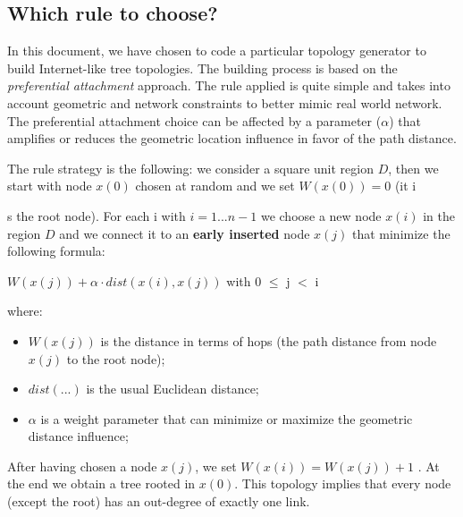 \documentclass[a4paper,11pt]{article}
\begin{document}
\subsection{Which rule to choose?}
\label{sec:rule}

In this document, we have chosen to code a particular topology generator
to build Internet-like tree topologies. The building process is based
on the \emph{preferential attachment} approach. The rule applied is
quite simple and takes into account geometric and network constraints
to better mimic real world network. The preferential attachment choice
can be affected by a parameter ($ \alpha $) that amplifies or reduces the
geometric location influence in favor of the path distance. 

The rule strategy is the following: we consider a square unit region
$D$, then we start with node $x(0)$ chosen at random and we set $W(x(0))
= 0$ (it i

s the root node). For each i with $i = 1...n-1$ we choose a
new node $x(i)$ in the region $D$ and we connect it to an \textbf{early
inserted} node $x(j)$ that minimize the following formula:

\begin{center}
$W(x(j)) + \alpha \cdot dist(x(i), x(j))$ with 0 $\leq$ j $<$ i
\end{center}

where: 

\begin{itemize}
\item $W(x(j))$ is the distance in terms of hops (the path distance from node
$x(j)$ to the root node); 
\item $dist(...)$ is the usual Euclidean distance; 
\item $ \alpha $ is a weight parameter that can minimize or maximize 
the geometric distance influence;
 
\end{itemize}

After having chosen a node $x(j)$, we set $W(x(i)) = W(x(j))+1$ . At
the end we obtain a tree rooted in $x(0)$. This topology implies that
every node (except the root) has an out-degree of exactly one link.

\end{document}
